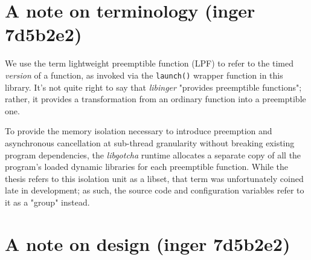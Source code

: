 \documentclass[12pt,letterpaper]{book}
\begin{document}
\section{A note on terminology (inger 7d5b2e2)}

We use the term lightweight preemptible function (LPF) to refer to the timed \textit{version} of a
function, as invoked via the \texttt{launch()} wrapper function in this library.  It's not quite right to
say that \textit{libinger} "provides preemptible functions"; rather, it provides a transformation from
an ordinary function into a preemptible one.

To provide the memory isolation necessary to introduce preemption and asynchronous cancellation at
sub-thread granularity without breaking existing program dependencies, the \textit{libgotcha} runtime
allocates a separate copy of all the program's loaded dynamic libraries for each preemptible
function.  While the thesis refers to this isolation unit as a libset, that term was unfortunately
coined late in development; as such, the source code and configuration variables refer to it as a
"group" instead.


\section{A note on design (inger 7d5b2e2)}
\end{document}
